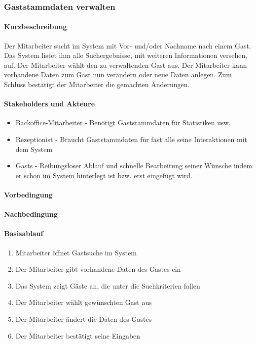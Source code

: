 \subsubsection{Gaststammdaten verwalten}

\paragraph{Kurzbeschreibung}
Der Mitarbeiter sucht im System mit Vor- und/oder Nachname nach einem Gast. Das System listet ihm alle Suchergebnisse, mit weiteren Informationen versehen, auf. Der Mitarbeiter wählt den zu verwaltenden Gast aus. Der Mitarbeiter kann vorhandene Daten zum Gast nun verändern oder neue Daten anlegen. Zum Schluss bestätigt der Mitarbeiter die gemachten Änderungen.

\paragraph{Stakeholders und Akteure}
\begin{itemize}
	\item Backoffice-Mitarbeiter - Benötigt Gaststammdaten für Statistiken usw.
	\item \Gls{Rezeptionist} - Braucht Gaststammdaten für fast alle seine Interaktionen mit dem System
	\item \Glspl{Gast} - Reibungsloser Ablauf und schnelle Bearbeitung seiner Wünsche indem er schon im System hinterlegt ist bzw. erst eingefügt wird.
\end{itemize}

\paragraph{Vorbedingung}


\paragraph{Nachbedingung}

\paragraph{Basisablauf}
\begin{enumerate}
	\item Mitarbeiter öffnet Gastsuche im System
	\item Der Mitarbeiter gibt vorhandene Daten des Gastes ein
	\item Das System zeigt Gäste an, die unter die Suchkriterien fallen
	\item Der Mitarbeiter wählt gewünschten Gast aus
	\item Der Mitarbeiter ändert die Daten des Gastes
	\item Der Mitarbeiter bestätigt seine Eingaben
\end{enumerate}

